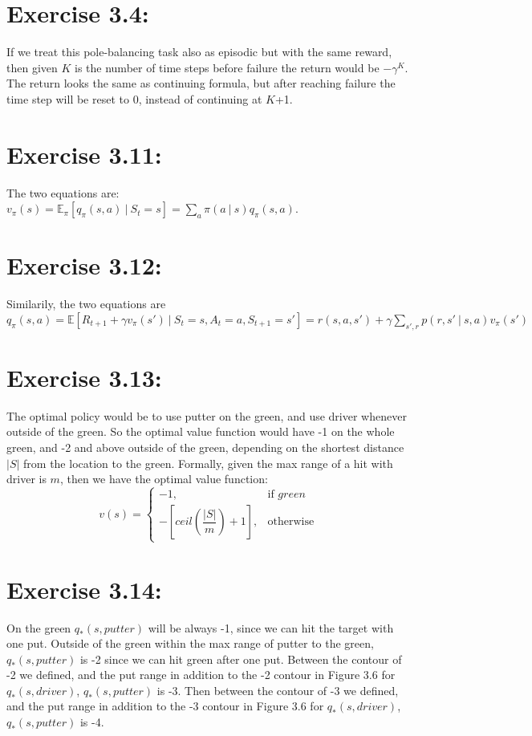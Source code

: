 \documentclass[10pt,letterpaper]{article}
\newcommand\given[1][]{\:#1\vert\:}
\begin{document}
\section*{Exercise 3.4: }
\label{3.4}

If we treat this pole-balancing task also as episodic but with the same reward, then given $K$ is the number of time steps before failure the return would be $-\gamma^K$. The return looks the same as continuing formula, but after reaching failure the time step will be reset to 0, instead of continuing at $K$+1.


\section*{Exercise 3.11: }
\label{3.11}

The two equations are: $v_\pi(s) = \mathbb{E}_\pi[q_\pi(s,a)\given S_t=s] = \sum_a \pi(a\given s)q_\pi(s,a)$.


\section*{Exercise 3.12: }
\label{3.12}

Similarily, the two equations are $q_\pi(s,a) = \mathbb{E}[R_{t+1} + \gamma v_\pi(s') \given S_t=s, A_t=a, S_{t+1} = s'] = r(s,a,s') + \gamma\sum_{s',r}p(r,s'\given s,a)v_\pi(s')$


\section*{Exercise 3.13: }
\label{3.13}

The optimal policy would be to use putter on the green, and use driver whenever outside of the green. So the optimal value function would have -1 on the whole green, and -2 and above outside of the green, depending on the shortest distance $|S|$ from the location to the green. Formally, given the max range of a hit with driver is $m$, then we have the optimal value function:
\[v(s) = \begin{cases}
-1,& \text{if } green\\
-[ceil(\dfrac{|S|}{m}) + 1],              & \text{otherwise}
\end{cases}
\]


\section*{Exercise 3.14: }
\label{3.14}

On the green $q_*(s, putter)$ will be always -1, since we can hit the target with one put. Outside of the green within the max range of putter to the green, $q_*(s, putter)$ is -2 since we can hit green after one put. Between the contour of -2 we defined, and the put range in addition to the -2 contour in Figure 3.6 for $q_*(s, driver)$, $q_*(s, putter)$ is -3. Then between the contour of -3 we defined, and the put range in addition to the -3 contour in Figure 3.6 for $q_*(s, driver)$, $q_*(s, putter)$ is -4.



\clearpage
\end{document}
